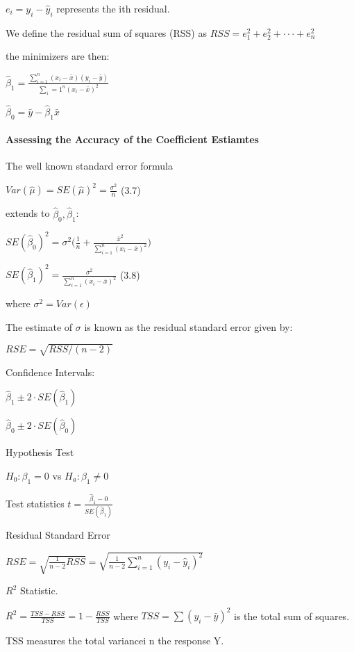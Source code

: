 \documentclass[
]{article}
\begin{document}
\(e_i = y_i-\hat{y}_i\) represents the ith residual.

We define the residual sum of squares (RSS) as
\(RSS=e_{1}^2 + e_{2}^2 +\cdot\cdot\cdot+e_{n}^2\)

the minimizers are then:

\(\hat\beta_1 = \frac{\sum_{i=1}^n (x_i-\bar{x})(y_i-\bar{y})}{\sum_i={1}^n(x_i-\bar{x})^2}\)

\(\hat\beta_0 = \bar{y} - \hat\beta_1 \bar{x}\)

\hypertarget{assessing-the-accuracy-of-the-coefficient-estiamtes}{%
\paragraph{Assessing the Accuracy of the Coefficient
Estiamtes}\label{assessing-the-accuracy-of-the-coefficient-estiamtes}}

The well known standard error formula

\(Var(\hat{\mu}) = SE(\hat{\mu})^2 = \frac{\sigma^2}{n}\) (3.7)

extends to \(\hat\beta_0,\hat\beta_1\):

\(SE(\hat\beta_0)^2 = \sigma^2\big(\frac{1}{n} + \frac{\bar{x}^2}{\sum_{i=1}^n(x_i-\bar{x})^2}\big)\)

\(SE(\hat\beta_1)^2 = \frac{\sigma^2}{\sum_{i=1}^n (x_i-\bar{x})^2}\)
(3.8)

where \(\sigma^2 = Var(\epsilon)\)

The estimate of \(\sigma\) is known as the residual standard error given
by:

\(RSE = \sqrt{RSS/(n-2)}\)

Confidence Intervals:

\(\hat\beta_1 \pm 2\cdot SE(\hat\beta_1)\)

\(\hat\beta_0 \pm 2\cdot SE(\hat\beta_0)\)

Hypothesis Test

\(H_0 :\beta_1 = 0\) vs \(H_a :\beta_1 \neq 0\)

Test statistics \(t = \frac{\hat\beta_1 - 0}{SE(\hat\beta_1)}\)

Residual Standard Error

\(RSE = \sqrt{\frac{1}{n-2} RSS} = \sqrt{\frac{1}{n-2} \sum_{i=1}^n (y_i-\hat y_i)^2}\)

\(R^2\) Statistic.

\(R^2 = \frac{TSS - RSS}{TSS} = 1-\frac{RSS}{TSS}\) where
\(TSS = \sum(y_i-\bar{y})^2\) is the total sum of squares.

TSS measures the total variancei n the response Y.
\end{document}
